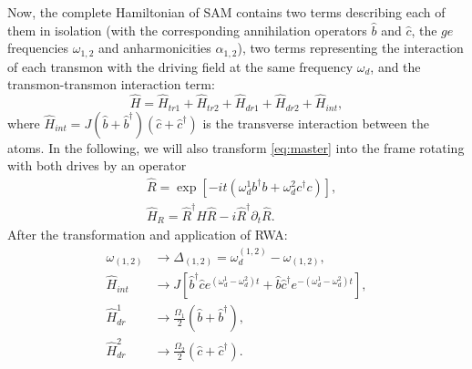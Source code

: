\documentclass[%
 aip,
 amsmath,amssymb,
 reprint,%
]{revtex4-1}
\begin{document}
Now, the complete Hamiltonian of SAM contains two terms describing each of them in isolation (with the corresponding annihilation operators $\hat b$ and $\hat c$, the $ge$ frequencies $\omega_{1,2}$ and anharmonicities $\alpha_{1,2}$), two terms representing the interaction of each transmon with the driving field at the same frequency $\omega_d$, and the transmon-transmon interaction term:
\begin{equation}\label{Hsystem}
\hat H = \hat H_{tr1}+\hat H_{tr2}+\hat H_{dr1}+\hat H_{dr2}+\hat H_{int},
\end{equation}
where $\hat H_{int} = J (\hat b +\hat b^\dag)(\hat c+\hat c^{\dagger})$ is the transverse interaction between the atoms. In the following, we will also transform \eqref{eq:master} into the frame rotating with both drives by an operator
\begin{align}
&\hat R = \exp[-i t (\omega_d^1 b^{\dagger}b+\omega_d^2 c^{\dagger}c)],\\
&\hat H_R = \hat R^{\dagger}\hat H \hat R - i\hat R^{\dagger}\partial_t \hat R.
\end{align}
After the transformation and application of RWA:
\begin{equation}
\begin{aligned}
	\omega_{(1,2)} &\rightarrow \Delta_{(1,2)} = \omega_d^{(1,2)}-\omega_{(1,2)},\\
	\hat H_{int} &\rightarrow J \left[\hat b^\dag \hat c e^{(\omega_d^1 - \omega_d^2)t} + \hat b \hat c^\dag e^{-(\omega_d^1 - \omega_d^2)t}\right],\\
	\hat H_{dr}^1 &\rightarrow \frac{\Omega_1}{2}(\hat b  + \hat b^\dag),\\ 
	\hat H_{dr}^2 &\rightarrow \frac{\Omega_2}{2}(\hat c  + \hat c^\dag).
\end{aligned}
\label{eq:RWA}
\end{equation}
\end{document}
